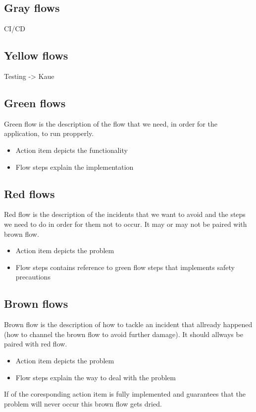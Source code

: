 \subsection{Gray flows}\label{philo:gray:flow}
CI/CD
\subsection{Yellow flows}\label{philo:Yellow:flow}
Testing -> Kaue
\subsection{Green flows}\label{philo:green:flow}
Green flow is the description of the flow that we need, in order for the application, to run propperly. 
\begin{itemize}
  \item Action item depicts the functionality 
  \item Flow steps explain the implementation
\end{itemize}
\subsection{Red flows}\label{philo:red:flow}
Red flow is the description of the incidents that we want to avoid and the steps we need to do in order for them not to occur. It may or may not be paired with brown flow.
\begin{itemize}
  \item Action item depicts the problem 
  \item Flow steps contains reference to green flow steps that implements safety precautions
\end{itemize}
\subsection{Brown flows}\label{philo:brown:flow}
Brown flow is the description of how to tackle an incident that allready happened (how to channel the brown flow to avoid further damage). It should allways be paired with red flow.
\begin{itemize}
  \item Action item depicts the problem 
  \item Flow steps explain the way to deal with the problem
\end{itemize}
If  of the coresponding action item is fully implemented and guarantees that the problem will never occur this brown flow gets dried.

